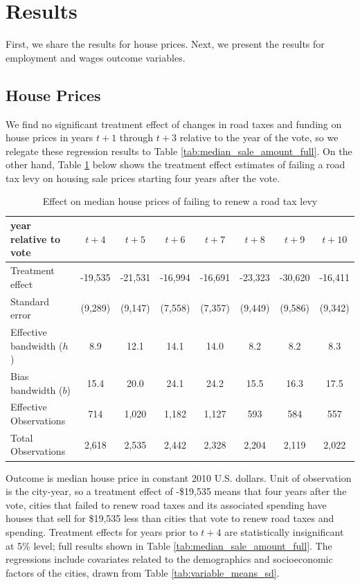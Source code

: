 \section{Results} \label{sec:results}

First, we share the results for house prices. Next, we present the results for employment and wages outcome variables.

\subsection{House Prices}

We find no significant treatment effect of changes in road taxes and funding on house prices in years $t+1$ through $t+3$ relative to the year of the vote, so we relegate these regression results to Table \ref{tab:median_sale_amount_full}.  On the other hand, Table \ref{tab:median_sale_amount} below shows the treatment effect estimates of failing a road tax levy on housing sale prices starting four years after the vote. 

\begin{table}[ht]
    \centering
    \caption{Effect on median house prices of failing to renew a road tax levy}
    \label{tab:median_sale_amount}
    \begin{tabular}{p{2cm}ccccccc}
        \hline
        year relative to vote & $t + 4$ & $t + 5$ & $t + 6$ & $t + 7$ & $t + 8$ & $t + 9$ & $t + 10$ \\
        \hline
        Treatment effect & -19,535 & -21,531 & -16,994 & -16,691 & -23,323 & -30,620 & -16,411 \\
        Standard error & (9,289) & (9,147) & (7,558) & (7,357) & (9,449) & (9,586) & (9,342) \\
        Effective bandwidth ($h$) & 8.9 & 12.1 & 14.1 & 14.0 & 8.2 & 8.2 & 8.3 \\
        Bias bandwidth ($b$) & 15.4 & 20.0 & 24.1 & 24.2 & 15.5 & 16.3 & 17.5 \\
        Effective Observations & 714 & 1,020 & 1,182 & 1,127 & 593 & 584 & 557 \\
        Total Observations & 2,618 & 2,535 & 2,442 & 2,328 & 2,204 & 2,119 & 2,022 \\
        \hline
    \end{tabular}
    \begin{tablenotes}
        \small
        \item Outcome is median house price in constant 2010 U.S. dollars. Unit of observation is the city-year, so a treatment effect of -\$19,535 means that four years after the vote, cities that failed to renew road taxes and its associated spending have houses that sell for \$19,535 less than cities that vote to renew road taxes and spending. Treatment effects for years prior to $t + 4$ are statistically insignificant at 5\% level; full results shown in Table \ref{tab:median_sale_amount_full}. The regressions include covariates related to the demographics and socioeconomic factors of the cities, drawn from Table \ref{tab:variable_means_sd}.
    \end{tablenotes}
\end{table}

